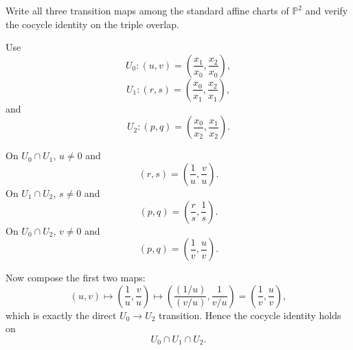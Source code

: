 \begin{problem}\label{prob:vi36-02}
Write all three transition maps among the standard affine charts of \(\mathbb P^2\) and verify the cocycle identity on the triple overlap.
\end{problem}

\ifdefined\FullProblemDossiers
\begin{solution}
Use
\[
U_0:(u,v)=\left(\frac{x_1}{x_0},\frac{x_2}{x_0}\right),
\]
\[
U_1:(r,s)=\left(\frac{x_0}{x_1},\frac{x_2}{x_1}\right),
\]
and
\[
U_2:(p,q)=\left(\frac{x_0}{x_2},\frac{x_1}{x_2}\right).
\]

On \(U_0\cap U_1\), \(u\neq0\) and
\[
(r,s)=\left(\frac1u,\frac vu\right).
\]
On \(U_1\cap U_2\), \(s\neq0\) and
\[
(p,q)=\left(\frac rs,\frac1s\right).
\]
On \(U_0\cap U_2\), \(v\neq0\) and
\[
(p,q)=\left(\frac1v,\frac uv\right).
\]

Now compose the first two maps:
\[
(u,v)
\longmapsto
\left(\frac1u,\frac vu\right)
\longmapsto
\left(
\frac{(1/u)}{(v/u)},
\frac1{v/u}
\right)
=
\left(\frac1v,\frac uv\right),
\]
which is exactly the direct \(U_0\to U_2\) transition. Hence the cocycle identity holds on
\[
U_0\cap U_1\cap U_2.
\]
\end{solution}
\fi
